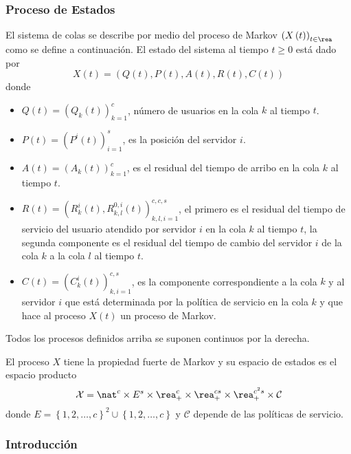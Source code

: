 \subsubsection{Proceso de Estados}
El sistema de colas se describe por medio del proceso de Markov
$\left(X\left(t\right)\right)_{t\in\rea}$ como se define a
continuaci\'on. El estado del sistema al tiempo $t\geq0$ est\'a dado
por
\[X\left(t\right)=\left(Q\left(t\right),P\left(t\right),A\left(t\right),R\left(t\right),C\left(t\right)\right)\]
donde
\begin{itemize}
\item
$Q\left(t\right)=\left(Q_{k}\left(t\right)\right)_{k=1}^{c}$,
n\'umero de usuarios en la cola $k$ al tiempo $t$. \item
$P\left(t\right)=\left(P^{i}\left(t\right)\right)_{i=1}^{s}$, es
la posici\'on del servidor $i$. \item
$A\left(t\right)=\left(A_{k}\left(t\right)\right)_{k=1}^{c}$, es
el residual del tiempo de arribo en la cola $k$ al tiempo $t$.
\item
$R\left(t\right)=\left(R_{k}^{i}\left(t\right),R_{k,l}^{0,i}\left(t\right)\right)_{k,l,i=1}^{c,c,s}$,
el primero es el residual del tiempo de servicio del usuario
atendido por servidor $i$ en la cola $k$ al tiempo $t$, la segunda
componente es el residual del tiempo de cambio del servidor $i$ de
la cola $k$ a la cola $l$ al tiempo $t$. \item
$C\left(t\right)=\left(C_{k}^{i}\left(t\right)\right)_{k,i=1}^{c,s}$,
es la componente correspondiente a la cola $k$ y al servidor $i$
que est\'a determinada por la pol\'itica de servicio en la cola $k$
y que hace al proceso $X\left(t\right)$ un proceso de Markov.
\end{itemize}
Todos los procesos definidos arriba se suponen continuos por la
derecha.

El proceso $X$ tiene la propiedad fuerte de Markov y su espacio de
estados es el espacio producto
\[\mathcal{X}=\nat^{c}\times E^{s}\times \rea_{+}^{c}\times\rea_{+}^{cs}\times\rea_{+}^{c^{2}s}\times \mathcal{C}\] donde $E=\left\{1,2,\ldots,c\right\}^{2}\cup\left\{1,2,\ldots,c\right\}$ y $\mathcal{C}$  depende de las pol\'iticas de servicio.

\subsubsection{Introducci{\'o}n}
%


